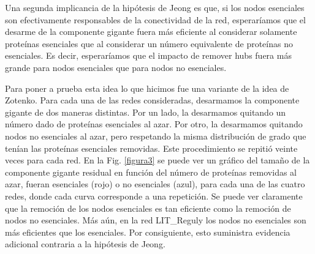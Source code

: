 \documentclass[%
 reprint,
 amsmath,amssymb,
 aps,
]{revtex4-1}
\begin{document}
Una segunda implicancia de la hip\'otesis de Jeong es que, si los nodos esenciales son efectivamente responsables de la conectividad de la red, esperar\'iamos que el desarme de la componente gigante fuera m\'as eficiente al considerar solamente prote\'inas esenciales que al considerar un n\'umero equivalente de prote\'inas no esenciales. Es decir, esperar\'iamos que el impacto de remover hubs fuera m\'as grande para nodos esenciales que para nodos no esenciales.

Para poner a prueba esta idea lo que hicimos fue una variante de la idea de Zotenko. Para cada una de las redes consideradas, desarmamos la componente gigante de dos maneras distintas. Por un lado, la desarmamos quitando un n\'umero dado de prote\'inas esenciales al azar. Por otro, la desarmamos quitando nodos no esenciales al azar, pero respetando la misma distribuci\'on de grado que ten\'ian las prote\'inas esenciales removidas. Este procedimiento se repiti\'o veinte veces para cada red. En la Fig. \ref{figura3} se puede ver un gr\'afico del tama\~no de la componente gigante residual en funci\'on del n\'umero de prote\'inas removidas al azar, fueran esenciales (rojo) o no esenciales (azul), para cada una de las cuatro redes, donde cada curva corresponde a una repetici\'on. Se puede ver claramente que la remoci\'on de los nodos esenciales es tan eficiente como la remoci\'on de nodos no esenciales. M\'as a\'un, en la red LIT\_Reguly los nodos no esenciales son m\'as eficientes que los esenciales. Por consiguiente, esto suministra evidencia adicional contraria a la hip\'otesis de Jeong.
\end{document}
